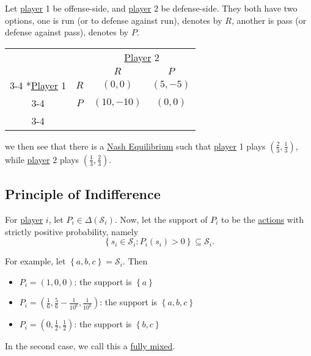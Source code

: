 \begin{eg}[Football]\label{eg:football}
	Let \hyperref[def:player]{player} 1 be offense-side, and \hyperref[def:player]{player} 2 be defense-side. They both have two options, one is
	run (or to defense against run), denotes by \(R\), another is pass (or defense against pass), denotes by \(P\).
	\begin{table}[H]
		\centering
		\setlength{\extrarowheight}{2pt}
		\begin{tabular}{cc|c|c|}
			                                               & \multicolumn{1}{c}{} & \multicolumn{2}{c}{\hyperref[def:player]{Player} 2}                           \\
			                                               & \multicolumn{1}{c}{} & \multicolumn{1}{c}{$R$}                             & \multicolumn{1}{c}{$P$} \\\cline{3-4}
			\multirow{2}*{\hyperref[def:player]{Player} 1} & $R$                  & $(0, 0)$                                            & $(5, -5)$               \\\cline{3-4}
			                                               & $P$                  & $(10, -10)$                                         & $(0, 0)$                \\\cline{3-4}
		\end{tabular}
	\end{table}
	we then see that there is a \hyperref[def:Nash-equilibrium]{Nash Equilibrium} such that \hyperref[def:player]{player} 1 plays \((\frac{2}{3}, \frac{1}{3})\), while
	\hyperref[def:player]{player} \(2\) plays \((\frac{1}{3}, \frac{2}{3})\).
\end{eg}

\subsection{Principle of Indifference}
For \hyperref[def:player]{player} \(i\), let \(P_i\in \Delta(\mathcal{S}_{i})\). Now, let the support of \(P_{i}\) to be the \hyperref[def:strategy]{actions} with strictly
positive probability, namely
\[
	\left\{s_{i}\in \mathcal{S}_{i}\colon P_{i}(s_{i})>0\right\}\subseteq \mathcal{S}_{i}.
\]

\begin{eg}
	For example, let \(\left\{a, b, c\right\} = \mathcal{S}_{i}\). Then
	\begin{itemize}
		\item \(P_{i} = (1, 0, 0)\): the support is \(\left\{a\right\}\)
		\item \(P_{i} = (\frac{1}{6}, \frac{5}{6} - \frac{1}{10^6}, \frac{1}{10^6})\): the support is \(\left\{a, b, c\right\}\)
		\item \(P_{i} = (0, \frac{1}{2}, \frac{1}{2})\): the support is \(\left\{b, c\right\}\)
	\end{itemize}
	\begin{note}
		In the second case, we call this a \hyperref[def:fully-mixed]{fully mixed}.
	\end{note}
\end{eg}

